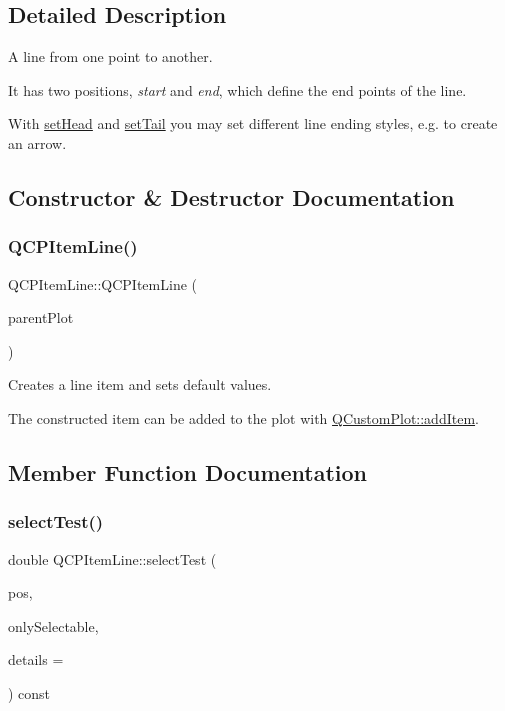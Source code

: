 \subsection{Detailed Description}
A line from one point to another. 

 It has two positions, {\itshape start} and {\itshape end}, which define the end points of the line.

With \hyperlink{class_q_c_p_item_line_aebf3d687114d584e0459db6759e2c3c3}{set\+Head} and \hyperlink{class_q_c_p_item_line_ac264222c3297a7efe33df9345c811a5f}{set\+Tail} you may set different line ending styles, e.\+g. to create an arrow. 

\subsection{Constructor \& Destructor Documentation}
\hypertarget{class_q_c_p_item_line_a17804b7f64961c6accf25b61e85142e3}{}\label{class_q_c_p_item_line_a17804b7f64961c6accf25b61e85142e3} 
\subsubsection{\texorpdfstring{Q\+C\+P\+Item\+Line()}{QCPItemLine()}}
{\footnotesize\ttfamily Q\+C\+P\+Item\+Line\+::\+Q\+C\+P\+Item\+Line (\begin{DoxyParamCaption}\item[{\hyperlink{class_q_custom_plot}{Q\+Custom\+Plot} $\ast$}]{parent\+Plot }\end{DoxyParamCaption})}

Creates a line item and sets default values.

The constructed item can be added to the plot with \hyperlink{class_q_custom_plot_aa500620379262321685cb7a7674cbd2a}{Q\+Custom\+Plot\+::add\+Item}. 

\subsection{Member Function Documentation}
\hypertarget{class_q_c_p_item_line_ae6cc5183f568e5fa9d7827abe4d405b5}{}\label{class_q_c_p_item_line_ae6cc5183f568e5fa9d7827abe4d405b5} 
\subsubsection{\texorpdfstring{select\+Test()}{selectTest()}}
{\footnotesize\ttfamily double Q\+C\+P\+Item\+Line\+::select\+Test (\begin{DoxyParamCaption}\item[{const Q\+PointF \&}]{pos,  }\item[{bool}]{only\+Selectable,  }\item[{Q\+Variant $\ast$}]{details = {} }\end{DoxyParamCaption}) const\hspace{0.3cm}{\ttfamily [virtual]}}

